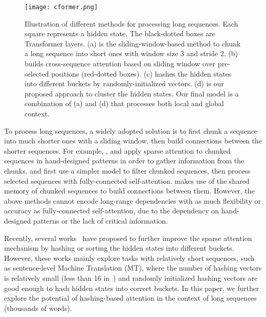 \documentclass[11pt,a4paper]{article}
\begin{document}
\begin{figure*}[t!]
\centering
\texttt{[image: cformer.png]}
\caption{Illustration of different methods for processing long sequences. Each square represents a hidden state. The black-dotted boxes are Transformer layers. (a) is the sliding-window-based method to chunk a long sequence into short ones with window size 3 and stride 2. (b) builds cross-sequence attention based on sliding window over pre-selected positions (red-dotted boxes). (c) hashes the hidden states into different buckets by randomly-initialized vectors. (d) is our proposed approach to cluster the hidden states. Our final model is a combination of (a) and (d) that processes both local and global context. }
\label{fig:comp}
\end{figure*} 

To process long sequences, a widely adopted solution is to first chunk a sequence into much shorter ones with a sliding window, then build connections between the shorter sequences.
For example, \citet{sparsetransf}, \citet{longformer} and \citet{zaheer2020big} apply sparse attention to chunked sequences in hand-designed patterns in order to gather information from the chunks.
\citet{choi2017coarse} and \citet{wang2019multi} first use a simpler model to filter chunked sequences, then process selected sequences with fully-connected self-attention.
\citet{rae2019compressive} makes use of the shared memory of chunked sequences to build connections between them.
However, the above
methods cannot encode long-range dependencies with as much flexibility or accuracy as fully-connected self-attention, due to the dependency on hand-designed patterns or the lack of critical information.

Recently, several works~\cite{reformer,tay2020sparse} have proposed to further improve the sparse attention mechanism by hashing or sorting the hidden states into different buckets.
However, these works mainly explore tasks with relatively short sequences, such as sentence-level Machine Translation (MT), where the number of hashing vectors is relatively small (less than 16 in~\citet{reformer}) and randomly initialized hashing vectors are good enough to hash hidden states into correct buckets.
In this paper, we further explore the potential of hashing-based attention
in the context of long sequences (thousands of words).
\end{document}
